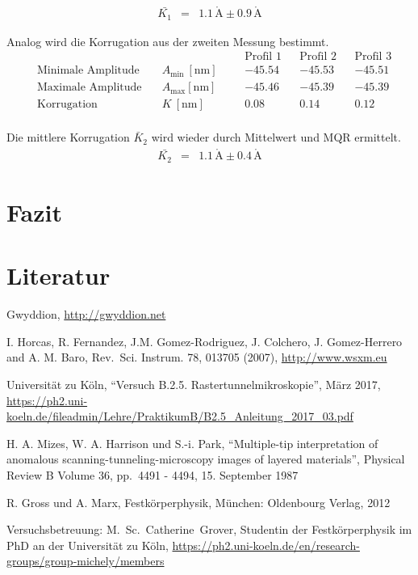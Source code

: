 \documentclass[12pt,a4paper]{scrartcl}
\numberwithin{equation}{section} %
\begin{document}
\begin{eqnarray}
    \bar{K_1} &=& 1.1 \mathrm{\,\mathring{A}} \pm 0.9 \mathrm{\,\mathring{A}}
\end{eqnarray}

Analog wird die Korrugation aus der zweiten Messung bestimmt.
\begin{align*}
    &&&&& \text{Profil 1}&& \text{Profil 2} && \text{Profil 3} \\
    &\text{Minimale Amplitude}\quad &A_\mathrm{min}\ [\mathrm{nm}] &&
        & -45.54 && -45.53 && -45.51 \\
    &\text{Maximale Amplitude}\quad &A_\mathrm{max} [\mathrm{nm}] &&
        & -45.46 && -45.39 && -45.39 \\
    &\text{Korrugation} &K\ [\mathrm{nm}] &&
        & 0.08 && 0.14 && 0.12 \\
\end{align*}

Die mittlere Korrugation $\bar K_2$ wird wieder durch Mittelwert und
MQR ermittelt.
\begin{eqnarray}
    \bar{K_2} &=& 1.1 \mathrm{\,\mathring{A}} \pm 0.4 \mathrm{\,\mathring{A}}
\end{eqnarray}

\hypertarget{fazit}{%
\section{Fazit}\label{fazit}}

\hypertarget{literatur}{%
\section{Literatur}\label{literatur}}
\begin{thebibliography}{9}
	Gwyddion, \url{http://gwyddion.net}

	I. Horcas, R. Fernandez, J.M. Gomez-Rodriguez, J. Colchero, J. Gomez-Herrero and A. M. Baro, Rev.~Sci. Instrum. 78, 013705 (2007), \url{http://www.wsxm.eu}

	Universität zu Köln, ``Versuch B.2.5. Rastertunnelmikroskopie'', März 2017, 	\url{https://ph2.uni-koeln.de/fileadmin/Lehre/PraktikumB/B2.5_Anleitung_2017_03.pdf}

	H. A. Mizes, W. A. Harrison und S.-i. Park, ``Multiple-tip interpretation of anomalous scanning-tunneling-microscopy images of layered materials'', Physical Review B Volume 36, pp.~4491 - 4494, 15. September 1987

	R. Gross und A. Marx, Festkörperphysik, München: Oldenbourg Verlag, 2012

	Versuchsbetreuung: M.~Sc.~Catherine~Grover, Studentin der Festkörperphysik im PhD an der Universität zu Köln, \url{https://ph2.uni-koeln.de/en/research-groups/group-michely/members}
\end{thebibliography}
\end{document}
